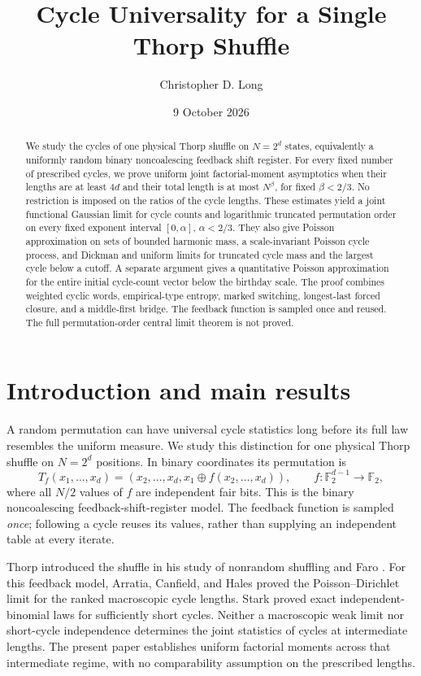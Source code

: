\documentclass[11pt]{article}
\title{Cycle Universality for a Single Thorp Shuffle}
\author{Christopher D. Long}
\date{9 October 2026}
\theoremstyle{remark}
\begin{document}
\maketitle
\begin{abstract}
We study the cycles of one physical Thorp shuffle on $N=2^d$ states,
equivalently a uniformly random binary noncoalescing feedback shift
register. For every fixed number of prescribed cycles, we prove uniform
joint factorial-moment asymptotics when their lengths are at least $4d$
and their total length is at most $N^\beta$, for fixed $\beta<2/3$.
No restriction is imposed on the ratios of the cycle lengths. These
estimates yield a joint functional Gaussian limit for cycle counts and
logarithmic truncated permutation order on every fixed exponent interval
$[0,\alpha]$, $\alpha<2/3$. They also give Poisson approximation on sets
of bounded harmonic mass, a scale-invariant Poisson cycle process, and
Dickman and uniform limits for truncated cycle mass and the largest cycle
below a cutoff. A separate argument gives a quantitative Poisson
approximation for the entire initial cycle-count vector below the
birthday scale. The proof combines weighted cyclic words, empirical-type
entropy, marked switching, longest-last forced closure, and a
middle-first bridge. The feedback function is sampled once and reused.
The full permutation-order central limit theorem is not proved.
\end{abstract}

\section{Introduction and main
results}\label{introduction-and-main-results}

A random permutation can have universal cycle statistics long before its full
law resembles the uniform measure. We study this distinction for one physical
Thorp shuffle on $N=2^d$ positions. In binary coordinates its permutation is
\[
 T_f(x_1,\ldots,x_d)
 =(x_2,\ldots,x_d,x_1\oplus f(x_2,\ldots,x_d)),
 \qquad f:\mathbb F_2^{d-1}\longrightarrow\mathbb F_2,
\]
where all $N/2$ values of $f$ are independent fair bits. This is the binary
noncoalescing feedback-shift-register model. The feedback function is sampled
\emph{once}; following a cycle reuses its values, rather than supplying an
independent table at every iterate.

Thorp introduced the shuffle in his study of nonrandom shuffling and Faro
\cite{Thorp}. For this feedback model, Arratia, Canfield, and Hales
\cite{ACH} proved the Poisson--Dirichlet limit for the ranked macroscopic
cycle lengths. Stark \cite{Stark} proved exact independent-binomial laws
for sufficiently short cycles. Neither a macroscopic weak limit nor
short-cycle independence determines the joint statistics of cycles at
intermediate lengths. The present paper establishes uniform factorial
moments across that intermediate regime, with no comparability assumption
on the prescribed lengths.
\end{document}
